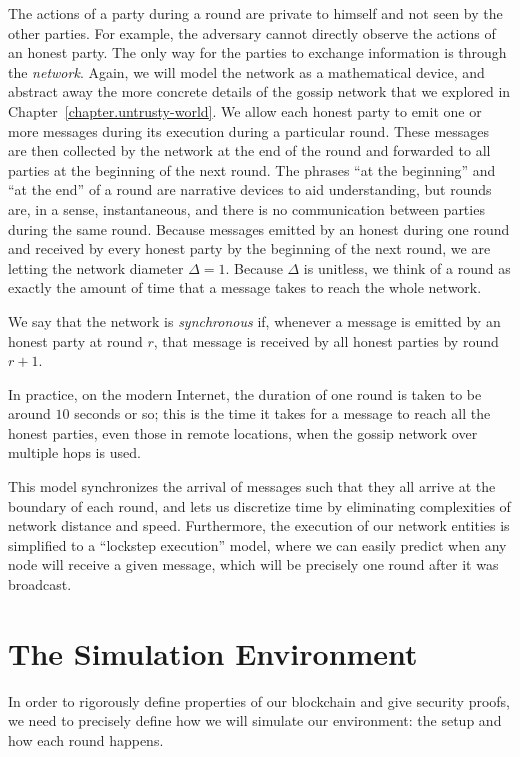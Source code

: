 The actions of a party during a round are private to himself and not seen by the other parties.
For example, the adversary cannot directly observe the actions of an honest party. The only way for
the parties to exchange information is through the \emph{network}. Again, we will model the network as a
mathematical device, and abstract away the more concrete details of the gossip network that
we explored in Chapter~\ref{chapter.untrusty-world}. We allow each honest party to emit one or more messages
during its execution during a particular round. These messages are then collected by the network at the end
of the round and forwarded to all parties at the beginning of the next round. The phrases ``at the beginning''
and ``at the end'' of a round are narrative devices to aid understanding, but rounds are, in a sense,
instantaneous, and there is no communication between parties during the same round. Because messages
emitted by an honest during one round and received by every honest party by the beginning of the next round,
we are letting the network diameter $\Delta = 1$. Because $\Delta$ is unitless, we think of a round as exactly
the amount of time that a message takes to reach the whole network.

\begin{definition}
    We say that the network is \emph{synchronous} if, whenever a message is emitted by an honest party at
    round $r$, that message is received by all honest parties by round $r+1$.
\end{definition}

In practice, on the modern Internet, the duration of one round is taken to be around $10$ seconds or so;
this is the time it takes for a message to reach all the honest parties, even those in remote locations,
when the gossip network over multiple hops is used.

This model synchronizes the arrival of messages such that they all arrive at the boundary of each round,
and lets us discretize time by eliminating complexities of network distance and speed. Furthermore, the execution
of our network entities is simplified to a ``lockstep execution'' model, where we can easily predict when
any node will receive a given message, which will be precisely one round after it was broadcast.

\section{The Simulation Environment}
In order to rigorously define properties of our blockchain and give security proofs, we need to precisely define how we will simulate our environment: the setup and how each round happens.

